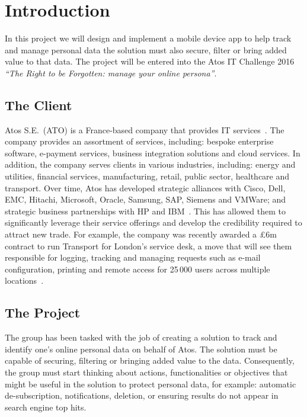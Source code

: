 \section{Introduction}

In this project we will design and implement a mobile device app to help track and manage personal data the solution must also secure, filter or bring added value to that data. The project will be entered into the Atos IT Challenge 2016 \emph{``The Right to be Forgotten: manage your online persona''}.

\subsection{The Client}

Atos S.E.~(ATO) is a France-based company that provides IT services~\parencite{web:reuters}. The company provides an assortment of services, including: bespoke enterprise software, e-payment services, business integration solutions and cloud services. In addition, the company serves clients in various industries, including: energy and utilities, financial services, manufacturing, retail, public sector, healthcare and transport. Over time, Atos has developed strategic alliances with Cisco, Dell, EMC, Hitachi, Microsoft, Oracle, Samsung, SAP, Siemens and VMWare; and strategic business partnerships with HP and IBM~\parencite{web:bloomberg}. This has allowed them to significantly leverage their service offerings and develop the credibility required to attract new trade. For example, the company was recently awarded a \pounds 6m contract to run Transport for London's service desk, a move that will see them responsible for logging, tracking and managing requests such as e-mail configuration, printing and remote access for 25\,000 users across multiple locations~\parencite{web:jee}.

\subsection{The Project}

The group has been tasked with the job of creating a solution to track and identify one’s online personal data on behalf of Atos. The solution must be capable of securing, filtering or bringing added value to the data. Consequently, the group must start thinking about actions, functionalities or objectives that might be useful in the solution to protect personal data, for example: automatic de-subscription, notifications, deletion, or ensuring results do not appear in search engine top hits.

